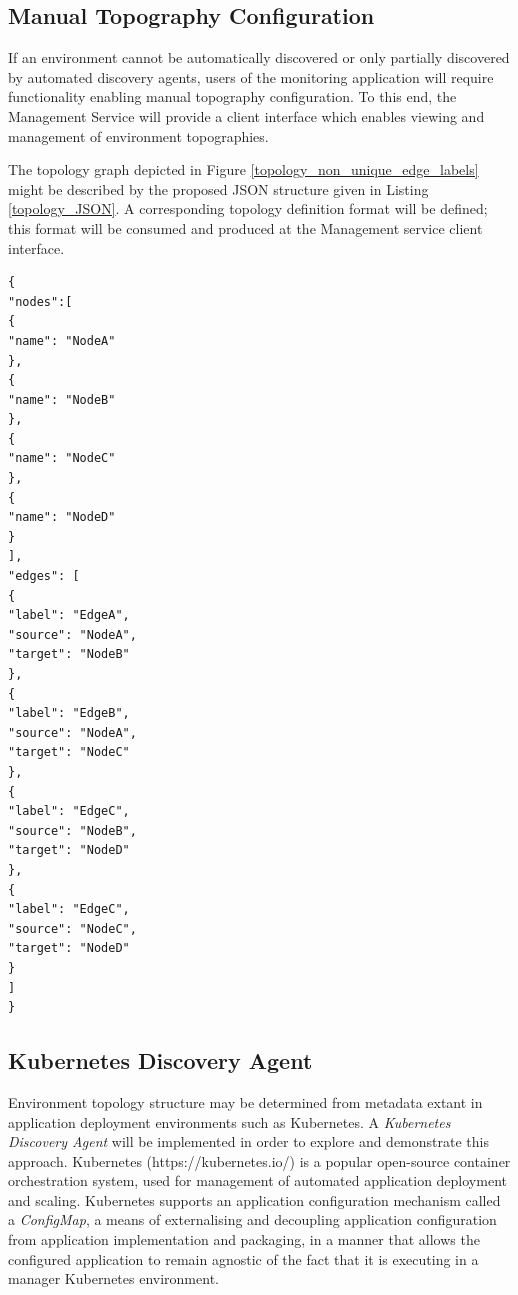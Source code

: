 \subsection{Manual Topography Configuration} \label{}

If an environment cannot be automatically discovered or only partially discovered by automated discovery agents, users of the monitoring application will require functionality enabling manual topography configuration. To this end, the Management Service will provide a client interface which enables viewing and management of environment topographies.

The topology graph depicted in Figure \ref{topology_non_unique_edge_labels} might be described by the  proposed JSON structure given in Listing \ref{topology_JSON}. A corresponding topology definition format will be defined; this format will be consumed and produced at the Management service client interface.

\vspace{5mm}

\begin{lstlisting}[caption={Sample JSON topology structure.},captionpos=b,label={topology_JSON}]
{
"nodes":[ 
{
"name": "NodeA"
},
{
"name": "NodeB"
},
{
"name": "NodeC"
},
{
"name": "NodeD"
}
],
"edges": [
{
"label": "EdgeA",
"source": "NodeA",
"target": "NodeB"
},
{
"label": "EdgeB",
"source": "NodeA",
"target": "NodeC"
},
{
"label": "EdgeC",
"source": "NodeB",
"target": "NodeD"
},
{
"label": "EdgeC",
"source": "NodeC",
"target": "NodeD"
}           
]
}
\end{lstlisting}


\subsection{Kubernetes Discovery Agent}\label{design_kubernetes_discovery_agent}

Environment topology structure may be determined from metadata extant in application deployment environments such as Kubernetes. A \textit{Kubernetes Discovery Agent} will be implemented in order to explore and demonstrate this approach.  Kubernetes (https://kubernetes.io/) is a popular open-source container orchestration system, used for management of automated application deployment and scaling. Kubernetes supports an application configuration mechanism called a \textit{ConfigMap}, a means of externalising and decoupling application configuration from application implementation and packaging, in a manner that allows the configured application to remain agnostic of the fact that it is executing in a manager Kubernetes environment.


